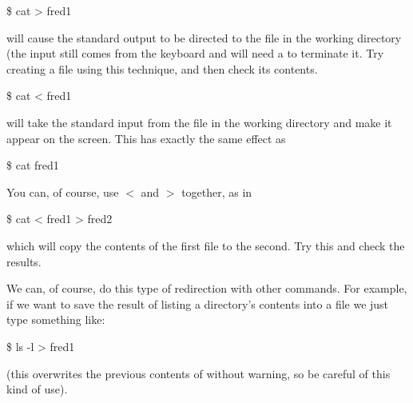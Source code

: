 \begin{ttoutenv}
\$  cat > fred1
\end{ttoutenv}
will cause the standard output to be directed to the file 
in the working directory (the input still comes from the keyboard and
will need a  to terminate it. Try creating a file
 using this technique, and then check its contents.

\begin{ttoutenv}
\$  cat < fred1
\end{ttoutenv}
will take the standard input from the file 
in the working directory and make it appear on the screen. This has
exactly the same effect as
\begin{ttoutenv}
\$  cat fred1
\end{ttoutenv}


You can, of course, use $<$ and $>$ together, as in
\begin{ttoutenv}
\$  cat < fred1 > fred2
\end{ttoutenv}
which will copy the contents of the first file to the second. Try this and
check the results.

We can, of course, do this type of redirection with other
commands. For example, if we want to save the result of listing a
directory's contents into a file we just type something like:
\begin{ttoutenv}
\$  ls -l > fred1
\end{ttoutenv}
(this overwrites the previous contents of  without
warning, so be careful of this kind of use).





